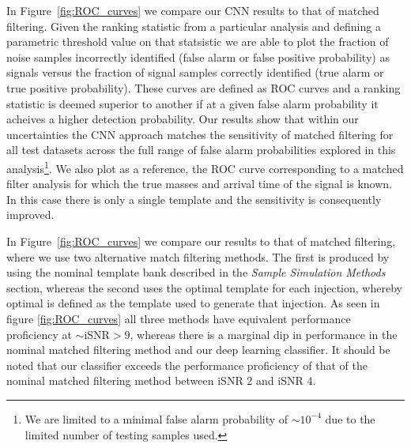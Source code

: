 \documentclass[%
showpacs,
 amsmath,amssymb,
 aps,
 twocolumn,
 prl,
 reprint,
floatfix,
]{revtex4-1}
\begin{document}
%
%
In Figure~\ref{fig:ROC_curves} we compare our \ac{CNN} results to that of
matched filtering. Given the ranking statistic from a particular analysis and
defining a parametric threshold value on that statsistic we are able to plot
the fraction of noise samples incorrectly identified (false alarm or false
positive probability) as signals versus the fraction of signal samples
correctly identified (true alarm or true positive probability). These curves
are defined as \ac{ROC} curves and a ranking statistic is deemed superior to
another if at a given false alarm probability it acheives a higher detection
probability. Our results show that within our uncertainties the \ac{CNN}
approach matches the sensitivity of matched filtering for all test datasets
across the full range of false alarm probabilities explored in this
analysis\footnote{We are limited to a minimal false alarm probability of $\sim
10^{-4}$ due to the limited number of testing samples used.}. We also plot as a
reference, the \ac{ROC} curve corresponding to a matched filter analysis for
which the true masses and arrival time of the signal is known. In this case
there is only a single template and the sensitivity is consequently improved.  

%
%
In Figure~\ref{fig:ROC_curves} we
compare our results to that of matched filtering, where we use two alternative
match filtering methods.  The first is produced by using the nominal template bank described
in the \textit{Sample Simulation Methods} section, whereas the second uses the
optimal template for each injection, whereby optimal is defined as the template
used to generate that injection. As seen in figure \ref{fig:ROC_curves} all
three methods have equivalent performance proficiency at $\sim \mathrm{iSNR} >
9$, whereas there is a marginal dip in performance in the nominal matched
filtering method and our deep learning classifier. It should be noted that our
classifier exceeds the performance proficiency of that of the nominal matched
filtering method between iSNR 2 and iSNR 4.
\end{document}
